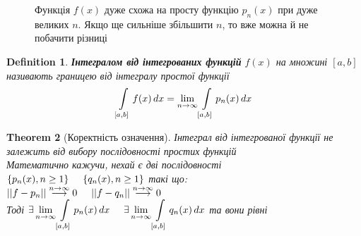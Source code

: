 \documentclass[a4paper, 14pt]{extarticle}
\def\huge{\displaystyle}
\theoremstyle{theoremdd}
\newtheorem{theorem}{Theorem}[subsection]
\theoremstyle{theoremdd}
\newtheorem{definition}[theorem]{Definition}
\theoremstyle{theoremdd}
\theoremstyle{theoremdd}
\theoremstyle{theoremdd}
\theoremstyle{theoremdd}
\theoremstyle{theoremdd}
\theoremstyle{theoremdd}
\begin{document}
\begin{figure}[H]
\centering


\caption*{Функція $f(x)$ дуже схожа на просту функцію $p_n(x)$ при дуже великих $n$. Якщо ще сильніше збільшити $n$, то вже можна й не побачити різниці}

\end{figure}

\begin{definition}
\textbf{Інтегралом від інтегрованих функцій} $f(x)$ на множині $[a,b]$ називають границею від інтегралу простої функції
\begin{align*}
\int\displaylimits_{[a,b]} f(x)\,dx = \lim_{n \to \infty} \int\displaylimits_{[a,b]} p_n(x)\,dx
\end{align*}
\end{definition}

\begin{theorem}[Коректність означення]
Інтеграл від інтегрованої функції не залежить від вибору послідовності простих функцій\\
Математично кажучи, нехай є дві послідовності \\ $\{p_n(x), n \geq 1\} \hspace{0.5cm} \{q_n(x), n \geq 1\}$ такі що:\\
$\huge ||f-p_n|| \overset{n \to \infty}{\longrightarrow} 0 \hspace{0.5cm}
\huge ||f-q_n|| \overset{n \to \infty}{\longrightarrow} 0$\\
Тоді $\exists \huge \lim_{n \to \infty} \int\displaylimits_{[a,b]} p_n(x)\,dx \hspace{0.5cm} \exists \lim_{n \to \infty} \int\displaylimits_{[a,b]} q_n(x)\,dx$ та вони рівні
\end{theorem}
\end{document}

